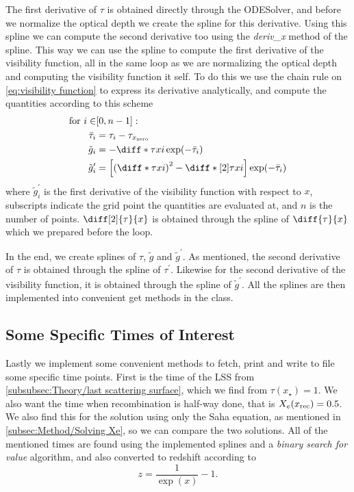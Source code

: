 \documentclass[10pt,a4paper]{article}
\begin{document}
The first derivative of $\tau$ is obtained directly through the ODESolver, and before we normalize the optical depth we create the spline for this derivative. Using this spline we can compute the second derivative too using the \textit{deriv\_x\(\)} method of the spline. This way we can use the spline to compute the first derivative of the visibility function, all in the same loop as we are normalizing the optical depth and computing the visibility function it self. To do this we use the chain rule on \cref{eq:visibility function} to express its derivative analytically, and compute the quantities according to this scheme
\begin{align*}
    \text{for } i \in &[0,n-1]:
    \\
    \bar{\tau}_i &= \tau_i - \tau_{x_{\rm{zero}}}
    \\
    \tilde{g}_i &= - \diff*{\tau}{x}{i}\exp(-\bar{\tau}_i)
    \\
    \tilde{g}_i^\prime &= \left[\left(\diff*{\tau}{x}{i}\right)^2-\diff*[2]{\tau}{x}{i}\right]\exp(-\bar{\tau}_i)
\end{align*}
where $\tilde{g}_i^\prime$ is the first derivative of the visibility function with respect to $x$, subscripts indicate the grid point the quantities are evaluated at, and $n$ is the number of points. $\diff[2]{\tau}{x}$ is obtained through the spline of $\diff{\tau}{x}$ which we prepared before the loop.

In the end, we create splines of $\tau$, $\tilde{g}$ and $\tilde{g}^\prime$. As mentioned, the second derivative of $\tau$ is obtained through the spline of $\tau^\prime$. Likewise for the second derivative of the visibility function, it is obtained through the spline of $\tilde{g}^\prime$. All the splines are then implemented into convenient get methods in the class.

\subsection{Some Specific Times of Interest}
\label{subsec:Method/Times of interest}
Lastly we implement some convenient methods to fetch, print and write to file some specific time points. First is the time of the LSS from \cref{subsubsec:Theory/last scattering surface}, which we find from $\tau(x_\star)=1$. We also want the time when recombination is half-way done, that is $X_e(x_{\rm{rec}}) = 0.5$. We also find this for the solution using only the Saha equation, as mentioned in \cref{subsec:Method/Solving Xe}, so we can compare the two solutions. All of the mentioned times are found using the implemented splines and a \textit{binary search for value} algorithm, and also converted to redshift according to
\begin{equation*}
    z = \frac{1}{\exp(x)}-1.
\end{equation*}
\end{document}
